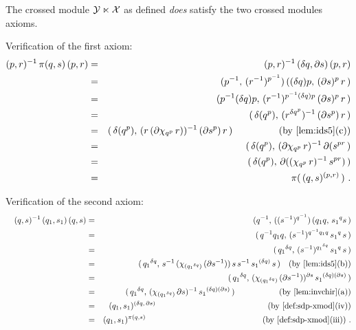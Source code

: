 \begin{thm}
The crossed module  $\mathcal{Y} \ltimes \mathcal{X}$  as defined
\emph{does} satisfy the two crossed modules axioms.
\end{thm}
\begin{pf}
Verification of the first axiom:
\begin{eqnarray*}
(p,r)^{-1}\,\pi(q,s)\,(p,r)
  & = &
   (p,r)^{-1}\,
      (\delta q, \partial s)\,
         (p,r)  \\
  & = &
   (p^{-1},\, (r^{-1})^{p^{-1}})\,
      ((\delta q)p,\, (\partial s)^p\,r\,)  \\
  & = &
   (p^{-1}(\delta q)p,\, 
      (r^{-1})^{p^{-1}(\delta q)p}\,(\partial s)^p\,r\,)  \\
  & = &
   (\,\delta(q^p),\, 
      (r^{\delta q^p})^{-1}\,(\partial s^p)\,r\,)  \\
  & = &
   (\,\delta(q^p),\, 
      (r\,(\partial\chi_{q^p}\,r))^{-1}\,(\partial s^p)\,r\,)
         \hspace{17mm} \mbox{(by \ref{lem:ids5}(c))}  \\
  & = &
   (\,\delta(q^p),\, (\partial\chi_{q^p}\,r)^{-1}\,
       \partial(s^{pr}\,) \\
  & = &
   (\,\delta(q^p),\, \partial( (\chi_{q^p}\,r)^{-1}\, s^{pr} )\,) \\
  & = &
   \pi(\,(q,s)^{(p,r)}\,) ~.
\end{eqnarray*}

\noindent
Verification of the second axiom:
\begin{eqnarray*}\quad
(q,s)^{-1}\,(q_1,s_1)\,(q,s)
  & = &
    (q^{-1},\,((s^{-1})^{q^{-1}})\,(q_1q,\,{s_1}^qs\,)  \\
  & = &
    (\,q^{-1}q_1q,\,(s^{-1})^{q^{-1}q_1q}\,{s_1}^q\,s\,)  \\
  & = &
    (\,{q_1}^{\delta q},\,(s^{-1})^{{q_1}^{\delta q}}\,{s_1}^q\,s\,)\\
  & = &
    (\,{q_1}^{\delta q},\, s^{-1}\,(\chi_{({q_1}^{\delta q})}\,
      (\partial s^{-1}))\,s\,s^{-1}\,
      {s_1}^{(\delta q)}\,s\,) 
         \quad \mbox{(by \ref{lem:ids5}(b))}  \\
  & = &
    (\,{q_1}^{\delta q},\, (\chi_{({q_1}^{\delta q})}\,
      (\partial s^{-1}))^{\partial s}\,
      {s_1}^{(\delta q)(\partial s)}\,) \\
  & = &
    (\,{q_1}^{\delta q},\, (\chi_{({q_1}^{\delta q})}\,\partial s)^{-1}\,
      {s_1}^{(\delta q)(\partial s)}\,) 
         \hspace{19mm} \mbox{(by \ref{lem:invchir}(a))}  \\
  & = &
    (q_1,s_1)^{(\delta q,\,\partial s)}  
         \hspace{48mm} \mbox{(by \ref{def:sdp-xmod}(iv))}  \\
  & = &
    (q_1,s_1)^{\pi(q,s)}
         \hspace{50mm} \mbox{(by \ref{def:sdp-xmod}(iii))} ~. \\
\end{eqnarray*}
\end{pf}

